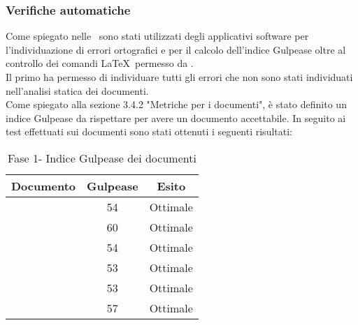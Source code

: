 \documentclass[../PianoDiQualifica.tex]{subfiles}
\begin{document}
			\subsubsection{Verifiche automatiche}
			Come spiegato nelle \normediprogettov\ sono stati utilizzati degli applicativi software per l'individuazione di errori ortografici e per il calcolo dell'indice Gulpease oltre al controllo dei comandi \LaTeX\ permesso da .\\
			Il primo ha permesso di individuare tutti gli errori che non sono stati individuati nell'analisi statica dei documenti.\\
			Come spiegato alla sezione 3.4.2 "Metriche per i documenti", è stato definito un indice Gulpease da rispettare per avere un documento accettabile. In seguito ai test effettuati sui documenti sono stati ottenuti i seguenti risultati:
			\newpage
			\begin{table}[h]
				\centering
				\begin{tabular}{l * {2}{c}}
					\toprule
						\textbf{Documento} & \textbf{Gulpease} & \textbf{Esito} \\
					\midrule
						\analisideirequisitiv & 54 & Ottimale \\
						\glossariov & 60 & Ottimale \\
						\normediprogettov & 54 & Ottimale \\
						\pianodiprogettov & 53 & Ottimale \\
						\pianodiqualificav & 53 & Ottimale \\
						\studiodifattibilitav & 57 & Ottimale \\		
					\bottomrule
				\end{tabular}
				\caption{Fase 1- Indice Gulpease dei documenti}
				\label{tab:esiti_gulpease}
			\end{table}
\end{document}
